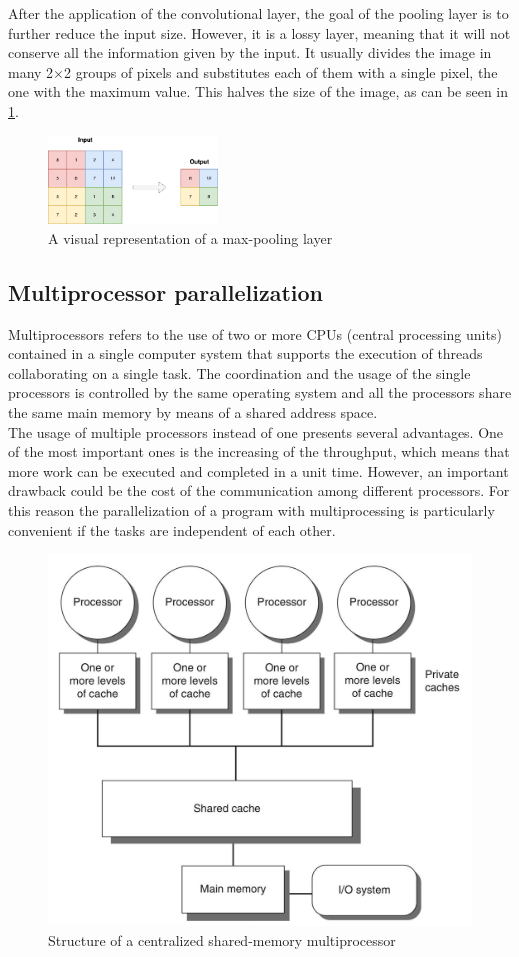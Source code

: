\documentclass{usiinftr}
\begin{document}
\noindent
After the application of the convolutional layer, the goal of the pooling layer  is to further reduce the input size. However, it  is a lossy layer, meaning that it will not conserve all the information given by the input.
It usually divides the image in many 2$\times$2 groups of pixels and substitutes each of them with a single pixel, the one with the maximum  value. This halves the size of the image, as can be seen in \ref{fig:12}.
\begin{figure}[H]
	\centering
	\includegraphics[width=0.4\textwidth]{img/maxpool}
	\caption{A visual representation of a max-pooling layer}
	\label{fig:12}
\end{figure}




\subsection{Multiprocessor parallelization}
Multiprocessors refers to the use of two or more CPUs (central processing units) contained in a single computer system that supports the execution of threads collaborating on a single task. The coordination and the usage of the single processors is controlled by the same operating system and all the processors share the same main memory by means of a shared address space.  \\
The usage of multiple processors instead of one presents several advantages. One of the most important ones is the increasing of the  throughput, which means that more work can be executed and completed in a unit time. However, an important drawback could be the cost of the communication among different processors. For this reason the parallelization of a program with multiprocessing is particularly convenient if the tasks are independent of each other.

\begin{figure}[h]
	\centering
	\includegraphics[width=0.35\linewidth]{img/multiprocessing}
	\caption{Structure of a centralized shared-memory multiprocessor \cite{14}}
	\label{fig:3}
\end{figure}
\end{document}
